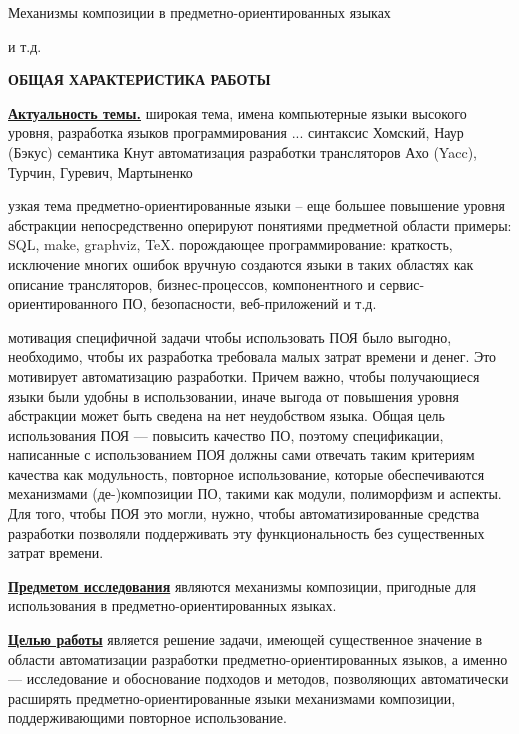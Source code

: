 \documentclass[12pt,a4paper]{article}
\date{}
\makeatletter
\theoremstyle{definition}
\theoremstyle{plain}
\renewcommand{\@oddhead}{\hfill{\large -\thepage-}\hfill}
\renewcommand{\@oddfoot}{}
\renewcommand{\@evenhead}{\hfill{\large -\thepage-}\hfill}
\renewcommand{\@evenfoot}{}
\newcommand{\afsection}[1]{\par \begin{center}\textbf{\MakeUppercase{#1}}\end{center}}
\newcommand{\afsubsection}[1]{\par \textbf{\underline{#1}}}
\makeatother
\begin{document}
Механизмы композиции в предметно-ориентированных языках

и т.д.

\thispagestyle{empty}
\newpage


\setlength{\topmargin}{-5mm} \makeatletter
\renewcommand{\@oddhead}{\hfill{\large -\thepage-}\hfill}
\renewcommand{\@oddfoot}{}
\renewcommand{\@evenhead}{\hfill{\large -\thepage-}\hfill}
\renewcommand{\@evenfoot}{}
\makeatother

\afsection{Общая характеристика работы}

\afsubsection{Актуальность темы.}
широкая тема, имена
компьютерные языки высокого уровня, разработка языков программирования ...
синтаксис
Хомский, Наур (Бэкус)
семантика Кнут
автоматизация разработки трансляторов
Ахо (Yacc), Турчин, Гуревич, Мартыненко

узкая тема
предметно-ориентированные языки -- еще большее повышение уровня абстракции
непосредственно оперируют понятиями предметной области
примеры: SQL, make, graphviz, \TeX.
порождающее программирование: краткость, исключение многих ошибок
вручную создаются языки в таких областях как описание трансляторов, бизнес-процессов, компонентного и сервис-ориентированного ПО, безопасности, веб-приложений и т.д.

мотивация специфичной задачи
чтобы использовать ПОЯ было выгодно, необходимо, чтобы их разработка требовала малых затрат времени и денег. Это мотивирует автоматизацию разработки. Причем важно, чтобы получающиеся языки были удобны в использовании, иначе выгода от повышения уровня абстракции может быть сведена на нет неудобством языка. Общая цель использования ПОЯ --- повысить качество ПО, поэтому спецификации, написанные с использованием ПОЯ должны сами отвечать таким критериям качества как модульность, повторное использование, которые обеспечиваются механизмами (де-)композиции ПО, такими как модули, полиморфизм и аспекты. Для того, чтобы ПОЯ это могли, нужно, чтобы автоматизированные средства разработки позволяли поддерживать эту функциональность без существенных затрат времени.

\afsubsection{Предметом исследования} являются механизмы композиции, пригодные для использования в предметно-ориентированных языках.

\afsubsection{Целью работы} является решение задачи, имеющей существенное значение в области автоматизации разработки предметно-ориентированных языков, а именно --- исследование и обоснование подходов и методов, позволяющих автоматически расширять предметно-ориентированные языки механизмами композиции, поддерживающими повторное использование.
\end{document}
